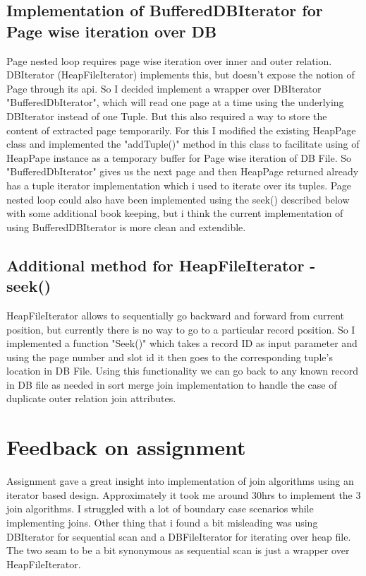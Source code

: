 \documentclass{article}
\begin{document}
\begin{titlepage}
\subsection{Implementation of BufferedDBIterator for Page wise iteration over DB}
Page nested loop requires page wise iteration over inner and outer relation. DBIterator (HeapFileIterator) implements this, but doesn't expose the notion of Page through its api. So I decided implement a wrapper over DBIterator "BufferedDbIterator", which will read one page at a time using the underlying DBIterator instead of one Tuple. But this also required a way to store the content of extracted page temporarily. For this I modified the existing HeapPage class and implemented the "addTuple()" method in this class to facilitate using of HeapPape instance as a temporary buffer for Page wise iteration of DB File.
So "BufferedDbIterator" gives us the next page and then HeapPage returned already has a tuple iterator implementation which i used to iterate over its tuples. Page nested loop could also have been implemented using the seek() described below with some additional book keeping, but i think the current implementation of using BufferedDBIterator is more clean and extendible.

\subsection{Additional method for HeapFileIterator - seek()}
HeapFileIterator allows to sequentially go backward and forward from current position, but currently there is no way to go to a particular record position. So I implemented a function "Seek()" which takes a record ID as input parameter and using the page number and slot id it then goes to the corresponding tuple's location in DB File. Using this functionality we can go back to any known record in DB file as needed in sort merge join implementation to handle the case of duplicate outer relation join attributes.

\section{Feedback on assignment}
Assignment gave a great insight into implementation of join algorithms using an iterator based design. Approximately it took me around 30hrs to implement the 3 join algorithms. I struggled with a lot of boundary case scenarios while implementing joins. Other thing that i found a bit misleading was using DBIterator for sequential scan and a DBFileIterator for iterating over heap file.  The two seam to be a bit synonymous as sequential scan is just a wrapper over HeapFileIterator. 

\end{titlepage}
\end{document}
